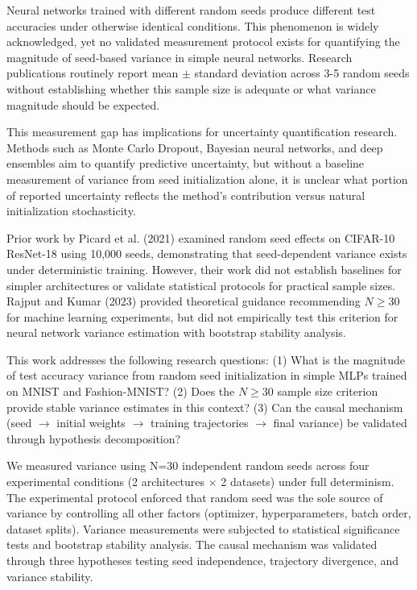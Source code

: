 
Neural networks trained with different random seeds produce different test accuracies under otherwise identical conditions. This phenomenon is widely acknowledged, yet no validated measurement protocol exists for quantifying the magnitude of seed-based variance in simple neural networks. Research publications routinely report mean $\pm$ standard deviation across 3-5 random seeds without establishing whether this sample size is adequate or what variance magnitude should be expected.

This measurement gap has implications for uncertainty quantification research. Methods such as Monte Carlo Dropout, Bayesian neural networks, and deep ensembles aim to quantify predictive uncertainty, but without a baseline measurement of variance from seed initialization alone, it is unclear what portion of reported uncertainty reflects the method's contribution versus natural initialization stochasticity.

Prior work by Picard et al. (2021) examined random seed effects on CIFAR-10 ResNet-18 using 10,000 seeds, demonstrating that seed-dependent variance exists under deterministic training. However, their work did not establish baselines for simpler architectures or validate statistical protocols for practical sample sizes. Rajput and Kumar (2023) provided theoretical guidance recommending $N\geq 30$ for machine learning experiments, but did not empirically test this criterion for neural network variance estimation with bootstrap stability analysis.

This work addresses the following research questions: (1) What is the magnitude of test accuracy variance from random seed initialization in simple MLPs trained on MNIST and Fashion-MNIST? (2) Does the $N\geq 30$ sample size criterion provide stable variance estimates in this context? (3) Can the causal mechanism (seed $\rightarrow$ initial weights $\rightarrow$ training trajectories $\rightarrow$ final variance) be validated through hypothesis decomposition?

We measured variance using N=30 independent random seeds across four experimental conditions (2 architectures $\times$ 2 datasets) under full determinism. The experimental protocol enforced that random seed was the sole source of variance by controlling all other factors (optimizer, hyperparameters, batch order, dataset splits). Variance measurements were subjected to statistical significance tests and bootstrap stability analysis. The causal mechanism was validated through three hypotheses testing seed independence, trajectory divergence, and variance stability.

